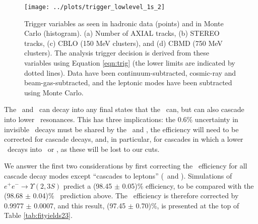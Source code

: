 \documentclass[aps,prd,preprint,superscriptaddress,tightenlines,nofootinbib,floatfix]{revtex4}
\begin{document}
\begin{figure}[p]
  \vspace{3 cm}
  \begin{center}
    \texttt{[image: ../plots/trigger\_lowlevel\_1s\_2]}
  \end{center}
  \caption{\label{fig:mctrig} Trigger variables as seen in hadronic
    data (points) and in Monte Carlo (histogram).  (a) Number of AXIAL
    tracks, (b) STEREO tracks, (c) CBLO (150 MeV clusters), and (d)
    CBMD (750 MeV clusters).  The analysis trigger decision is derived
    from these variables using Equation \ref{eqn:trig} (the lower
    limits are indicated by dotted lines).  Data have been
    continuum-subtracted, cosmic-ray and beam-gas-subtracted, and the
    leptonic modes have been subtracted using Monte Carlo.}
\end{figure}

The \utwo\ and \uthree\ can decay into any final states that the
\uone\ can, but can also cascade into lower \bbar\ resonances.  This
has three implications: the 0.6\% uncertainty in invisible \uone\
decays must be shared by the \utwo\ and \uthree, the efficiency will
need to be corrected for cascade decays, and, in particular, for
cascades in which a lower \ups\ decays into \ee\ or \mm, as these will
be lost to our cuts.

We answer the first two considerations by first correcting the \uone\
efficiency for all cascade decay modes except ``cascades to leptons''
(\ee\ and \mm).  Simulations of $e^+e^- \to \Upsilon(2,3S)$ predict a
(98.45 $\pm$ 0.05)\% efficiency, to be compared with the (98.68 $\pm$
0.04)\% \uone\ prediction above.
The \uone\ efficiency is therefore corrected by 0.9977 $\pm$ 0.0007,
and this result, (97.45 $\pm$ 0.70)\%, is presented at the top of
Table \ref{tab:fityields23}.
\end{document}
